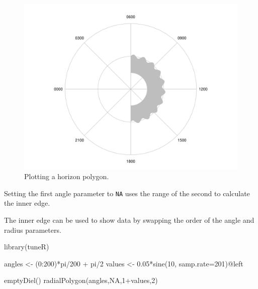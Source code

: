 \documentclass[
]{book}
\newenvironment{Shaded}{\begin{snugshade}}{\end{snugshade}}
\newcommand{\AttributeTok}[1]{\textcolor[rgb]{0.77,0.63,0.00}{#1}}
\newcommand{\ConstantTok}[1]{\textcolor[rgb]{0.00,0.00,0.00}{#1}}
\newcommand{\DecValTok}[1]{\textcolor[rgb]{0.00,0.00,0.81}{#1}}
\newcommand{\FloatTok}[1]{\textcolor[rgb]{0.00,0.00,0.81}{#1}}
\newcommand{\FunctionTok}[1]{\textcolor[rgb]{0.00,0.00,0.00}{#1}}
\newcommand{\NormalTok}[1]{#1}
\newcommand{\OtherTok}[1]{\textcolor[rgb]{0.56,0.35,0.01}{#1}}
\newcommand{\SpecialCharTok}[1]{\textcolor[rgb]{0.00,0.00,0.00}{#1}}
\begin{document}
\begin{figure}

{\centering \includegraphics[width=0.9\linewidth]{_main_files/figure-latex/radialPolygon-horizon-1} 

}

\caption{Plotting a horizon polygon.}\label{fig:radialPolygon-horizon}
\end{figure}

Setting the first angle parameter to \texttt{NA} uses the range of the second to calculate the inner edge.

The inner edge can be used to show data by swapping the order of the angle and radius parameters.

\begin{Shaded}
\begin{Highlighting}[]
\FunctionTok{library}\NormalTok{(tuneR)}

\NormalTok{angles }\OtherTok{\textless{}{-}}\NormalTok{ (}\DecValTok{0}\SpecialCharTok{:}\DecValTok{200}\NormalTok{)}\SpecialCharTok{*}\NormalTok{pi}\SpecialCharTok{/}\DecValTok{200} \SpecialCharTok{+}\NormalTok{ pi}\SpecialCharTok{/}\DecValTok{2}
\NormalTok{values }\OtherTok{\textless{}{-}} \FloatTok{0.05}\SpecialCharTok{*}\FunctionTok{sine}\NormalTok{(}\DecValTok{10}\NormalTok{, }\AttributeTok{samp.rate=}\DecValTok{201}\NormalTok{)}\SpecialCharTok{@}\NormalTok{left}

\FunctionTok{emptyDiel}\NormalTok{()}
\FunctionTok{radialPolygon}\NormalTok{(angles,}\ConstantTok{NA}\NormalTok{,}\DecValTok{1}\SpecialCharTok{+}\NormalTok{values,}\DecValTok{2}\NormalTok{)}
\end{Highlighting}
\end{Shaded}
\end{document}
